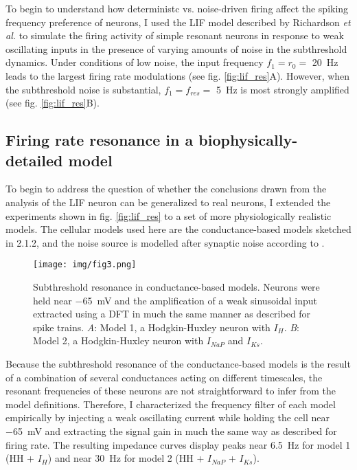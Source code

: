 \documentclass[12pt]{article}
\begin{document}
To begin to understand how deterministc vs. noise-driven firing affect the spiking frequency preference of neurons, I used the LIF model described by Richardson \textit{et al.} to simulate the firing activity of simple resonant neurons in response to weak oscillating inputs in the presence of varying amounts of noise in the subthreshold dynamics.
Under conditions of low noise, the input frequency $f_1 = r_0 = $ \SI{20}{\Hz} leads to the largest firing rate modulations (see fig. \ref{fig:lif_res}A). However, when the subthreshold noise is substantial, $f_1 = f_{res} = $ \SI{5}{\Hz} is most strongly amplified (see fig. \ref{fig:lif_res}B).


\subsection{Firing rate resonance in a biophysically-detailed model}

To begin to address the question of whether the conclusions drawn from the analysis of the LIF neuron can be generalized to real neurons, I extended the experiments shown in fig. \ref{fig:lif_res} to a set of more physiologically realistic models.
The cellular models used here are the conductance-based models sketched in 2.1.2, and the noise source is modelled after synaptic noise according to \cite{richardson_subthreshold_2003}.

\begin{figure}
    \texttt{[image: img/fig3.png]}
    \caption[Subthreshold resonance in conductance-based models]{
        Subthreshold resonance in conductance-based models. Neurons were held near \SI{-65}{\mV} and the amplification of a weak sinusoidal input extracted using a DFT in much the same manner as described for spike trains. \textit{A}: Model 1, a Hodgkin-Huxley neuron with $I_H$. \textit{B}: Model 2, a Hodgkin-Huxley neuron with $I_{NaP}$ and $I_{Ks}$.
        }
    \label{fig:cond_sub}
\end{figure}

Because the subthreshold resonance of the conductance-based models is the result of a combination of several conductances acting on different timescales, the resonant frequencies of these neurons are not straightforward to infer from the model definitions.
Therefore, I characterized the frequency filter of each model empirically by injecting a weak oscillating current while holding the cell near \SI{-65}{\mV} and extracting the signal gain in much the same way as described for firing rate.
The resulting impedance curves display peaks near \SI{6.5}{\Hz} for model 1 (HH + $I_H$) and near \SI{30}{\Hz} for model 2 (HH + $I_{NaP}$ + $I_{Ks}$).
\end{document}
